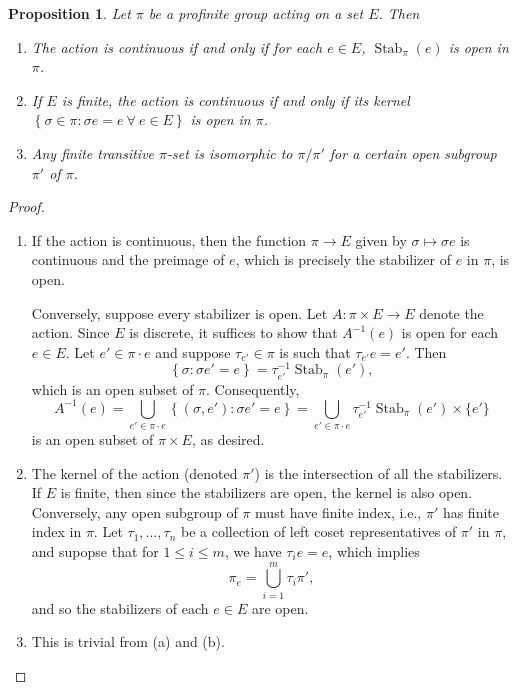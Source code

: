\documentclass[10pt]{article}
\theoremstyle{thmstyle}
\newtheorem{proposition}[theorem]{Proposition}
\theoremstyle{defstyle}
\renewcommand{\le}{\leqslant}
\newcommand{\Stab}{\operatorname{Stab}}
\begin{document}
\begin{proposition}
    Let $\pi$ be a profinite group acting on a set $E$. Then 
    \begin{enumerate}[label=(\arabic*)]
        \item The action is continuous if and only if for each $e\in E$, $\Stab_{\pi}(e)$ is open in $\pi$.
        \item If $E$ is finite, the action is continuous if and only if its kernel $\left\{\sigma\in\pi\colon \sigma e = e~\forall~e\in E\right\}$ is open in $\pi$.
        \item Any finite transitive $\pi$-set is isomorphic to $\pi/\pi'$ for a certain open subgroup $\pi'$ of $\pi$.
    \end{enumerate}
\end{proposition}
\begin{proof}
\begin{enumerate}[label=(\arabic*)]
    \item If the action is continuous, then the function $\pi\to E$ given by $\sigma\mapsto \sigma e$ is continuous and the preimage of $e$, which is precisely the stabilizer of $e$ in $\pi$, is open. 
    
    Conversely, suppose every stabilizer is open. Let $A: \pi\times E\to E$ denote the action. Since $E$ is discrete, it suffices to show that $A^{-1}(e)$ is open for each $e\in E$. Let $e'\in\pi\cdot e$ and suppose $\tau_{e'}\in\pi$ is such that $\tau_{e'} e = e'$. Then 
    \begin{equation*}
        \left\{\sigma\colon \sigma e' = e\right\} = \tau_{e'}^{-1}\Stab_{\pi}(e'),
    \end{equation*}
    which is an open subset of $\pi$. Consequently, 
    \begin{equation*}
        A^{-1}(e) = \bigcup_{e'\in\pi\cdot e} \left\{(\sigma, e')\colon \sigma e' = e\right\} = \bigcup_{e'\in\pi\cdot e}\tau_{e'}^{-1}\Stab_\pi(e')\times\{e'\}
    \end{equation*}
    is an open subset of $\pi\times E$, as desired.
    \item The kernel of the action (denoted $\pi'$) is the intersection of all the stabilizers. If $E$ is finite, then since the stabilizers are open, the kernel is also open. Conversely, any open subgroup of $\pi$ must have finite index, i.e., $\pi'$ has finite index in $\pi$. Let $\tau_1,\dots,\tau_n$ be a collection of left coset representatives of $\pi'$ in $\pi$, and supopse that for $1\le i\le m$, we have $\tau_i e = e$, which implies 
    \begin{equation*}
        \pi_e = \bigcup_{i = 1}^m\tau_i\pi',
    \end{equation*}
    and so the stabilizers of each $e\in E$ are open. 

    \item This is trivial from (a) and (b). \qedhere
\end{enumerate}
\end{proof}
\end{document}

